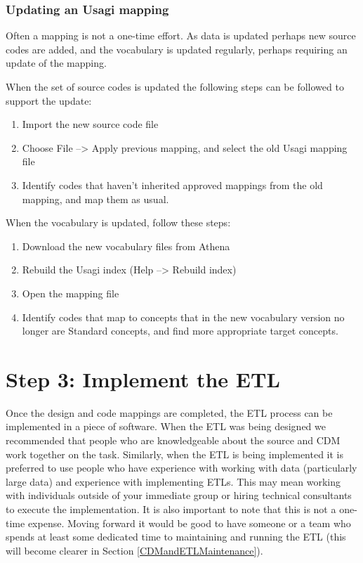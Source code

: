 \documentclass[11pt]{book}
\providecommand{\tightlist}{%
  \setlength{\itemsep}{0pt}\setlength{\parskip}{0pt}}
\theoremstyle{definition}
\theoremstyle{definition}
\theoremstyle{definition}
\theoremstyle{remark}
\begin{document}
\hypertarget{updating-an-usagi-mapping}{%
\subsubsection*{Updating an Usagi mapping}\label{updating-an-usagi-mapping}}

Often a mapping is not a one-time effort. As data is updated perhaps new source codes are added, and the vocabulary is updated regularly, perhaps requiring an update of the mapping.

When the set of source codes is updated the following steps can be followed to support the update:

\begin{enumerate}
\def\labelenumi{\arabic{enumi}.}
\tightlist
\item
  Import the new source code file
\item
  Choose File --\textgreater{} Apply previous mapping, and select the old Usagi mapping file
\item
  Identify codes that haven't inherited approved mappings from the old mapping, and map them as usual.
\end{enumerate}

When the vocabulary is updated, follow these steps:

\begin{enumerate}
\def\labelenumi{\arabic{enumi}.}
\tightlist
\item
  Download the new vocabulary files from Athena
\item
  Rebuild the Usagi index (Help --\textgreater{} Rebuild index)
\item
  Open the mapping file
\item
  Identify codes that map to concepts that in the new vocabulary version no longer are Standard concepts, and find more appropriate target concepts.
\end{enumerate}

\hypertarget{step-3-implement-the-etl}{%
\section{Step 3: Implement the ETL}\label{step-3-implement-the-etl}}

Once the design and code mappings are completed, the ETL process can be implemented in a piece of software. When the ETL was being designed we recommended that people who are knowledgeable about the source and CDM work together on the task. Similarly, when the ETL is being implemented it is preferred to use people who have experience with working with data (particularly large data) and experience with implementing ETLs. This may mean working with individuals outside of your immediate group or hiring technical consultants to execute the implementation. It is also important to note that this is not a one-time expense. Moving forward it would be good to have someone or a team who spends at least some dedicated time to maintaining and running the ETL (this will become clearer in Section \ref{CDMandETLMaintenance}).
\end{document}
